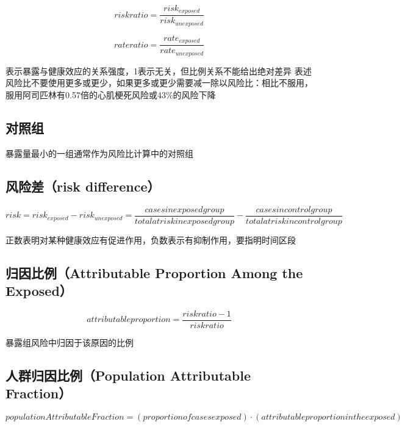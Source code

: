 \documentclass[]{book}
\begin{document}
\[risk ratio = \frac{risk_{exposed}}{risk_{unexposed}}\]

\[rate ratio = \frac{rate_{exposed}}{rate_{unexposed}}\]

表示暴露与健康效应的关系强度，1表示无关，但比例关系不能给出绝对差异
表述风险比不要使用更多或更少，如果更多或更少需要减一除以风险比：相比不服用，服用阿司匹林有0.57倍的心肌梗死风险或43\%的风险下降

\hypertarget{ux5bf9ux7167ux7ec4}{%
\subsection{对照组}\label{ux5bf9ux7167ux7ec4}}

暴露量最小的一组通常作为风险比计算中的对照组

\hypertarget{ux98ceux9669ux5deerisk-difference}{%
\subsection{风险差（risk difference）}\label{ux98ceux9669ux5deerisk-difference}}

\[risk = risk_{exposed} - risk_{unexposed} = \frac{cases in exposed group}{total at risk in exposed group} - \frac{cases in control group}{total at risk in control group}\]

正数表明对某种健康效应有促进作用，负数表示有抑制作用，要指明时间区段

\hypertarget{ux5f52ux56e0ux6bd4ux4f8battributable-proportion-among-the-exposed}{%
\subsection{归因比例（Attributable Proportion Among the Exposed）}\label{ux5f52ux56e0ux6bd4ux4f8battributable-proportion-among-the-exposed}}

\[attributable proportion = \frac{risk ratio - 1}{risk ratio}\]

暴露组风险中归因于该原因的比例

\hypertarget{ux4ebaux7fa4ux5f52ux56e0ux6bd4ux4f8bpopulation-attributable-fraction}{%
\subsection{人群归因比例（Population Attributable Fraction）}\label{ux4ebaux7fa4ux5f52ux56e0ux6bd4ux4f8bpopulation-attributable-fraction}}

\[population Attributable Fraction = (proportion of cases exposed) \cdot (attributable proportion in the exposed)\]
\end{document}

